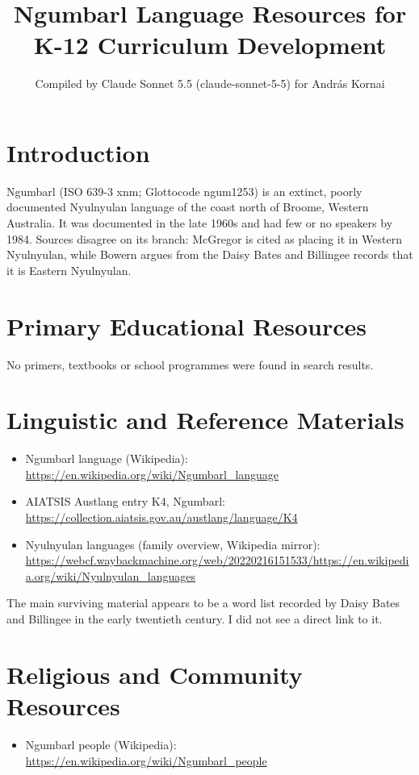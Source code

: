 \documentclass[12pt]{article}
\title{Ngumbarl Language Resources for K-12 Curriculum Development}
\author{Compiled by Claude Sonnet 5.5 (claude-sonnet-5-5) for Andr\'as Kornai}
\date{}
\begin{document}
\maketitle

\section{Introduction}
Ngumbarl (ISO 639-3 xnm; Glottocode ngum1253) is an extinct, poorly documented Nyulnyulan language of the coast north of Broome, Western Australia. It was documented in the late 1960s and had few or no speakers by 1984. Sources disagree on its branch: McGregor is cited as placing it in Western Nyulnyulan, while Bowern argues from the Daisy Bates and Billingee records that it is Eastern Nyulnyulan.

\section{Primary Educational Resources}
No primers, textbooks or school programmes were found in search results.

\section{Linguistic and Reference Materials}
\begin{itemize}
\item Ngumbarl language (Wikipedia): \url{https://en.wikipedia.org/wiki/Ngumbarl_language}
\item AIATSIS Austlang entry K4, Ngumbarl: \url{https://collection.aiatsis.gov.au/austlang/language/K4}
\item Nyulnyulan languages (family overview, Wikipedia mirror): \url{https://webcf.waybackmachine.org/web/20220216151533/https://en.wikipedia.org/wiki/Nyulnyulan_languages}
\end{itemize}
The main surviving material appears to be a word list recorded by Daisy Bates and Billingee in the early twentieth century. I did not see a direct link to it.

\section{Religious and Community Resources}
\begin{itemize}
\item Ngumbarl people (Wikipedia): \url{https://en.wikipedia.org/wiki/Ngumbarl_people}
\end{itemize}
\end{document}
